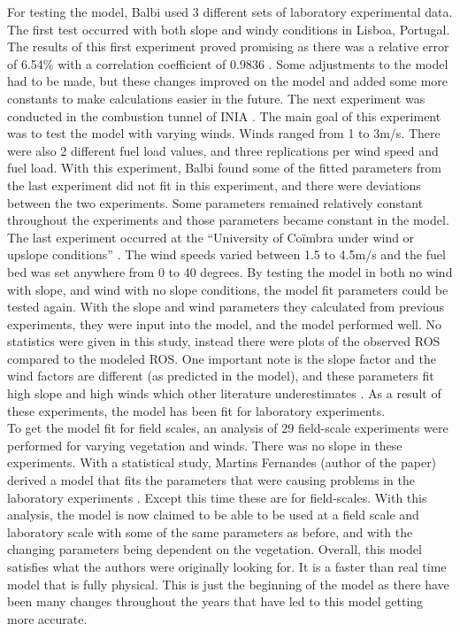 \documentclass{article}
\begin{document}
\indent For testing the model, Balbi used 3 different sets of laboratory experimental data. The first test occurred with both slope and windy conditions in Lisboa, Portugal. The results of this first experiment proved promising as there was a relative error of 6.54\% with a correlation coefficient of 0.9836 \citep{Balbi2007}. Some adjustments to the model had to be made, but these changes improved on the model and added some more constants to make calculations easier in the future. The next experiment was conducted in the combustion tunnel of INIA \citep{Balbi2007}. The main goal of this experiment was to test the model with varying winds. Winds ranged from 1 to 3m/s. There were also 2 different fuel load values, and three replications per wind speed and fuel load. With this experiment, Balbi found some of the fitted parameters from the last experiment did not fit in this experiment, and there were deviations between the two experiments. Some parameters remained relatively constant throughout the experiments and those parameters became constant in the model. The last experiment occurred at the “University of Coïmbra under wind or upslope conditions” \citep{Balbi2007}. The wind speeds varied between 1.5 to 4.5m/s and the fuel bed was set anywhere from 0 to 40 degrees. By testing the model in both no wind with slope, and wind with no slope conditions, the model fit parameters could be tested again. With the slope and wind parameters they calculated from previous experiments, they were input into the model, and the model performed well. No statistics were given in this study, instead there were plots of the observed ROS compared to the modeled ROS. One important note is the slope factor and the wind factors are different (as predicted in the model), and these parameters fit high slope and high winds which other literature underestimates \citep{Balbi2007}. As a result of these experiments, the model has been fit for laboratory experiments. \\
\indent To get the model fit for field scales, an analysis of 29 field-scale experiments were performed for varying vegetation and winds. There was no slope in these experiments. With a statistical study, Martins Fernandes (author of the paper) derived a model that fits the parameters that were causing problems in the laboratory experiments \citep{Balbi2007}. Except this time these are for field-scales. With this analysis, the model is now claimed to be able to be used at a field scale and laboratory scale with some of the same parameters as before, and with the changing parameters being dependent on the vegetation. Overall, this model satisfies what the authors were originally looking for. It is a faster than real time model that is fully physical. This is just the beginning of the model as there have been many changes throughout the years that have led to this model getting more accurate. \\
\end{document}
